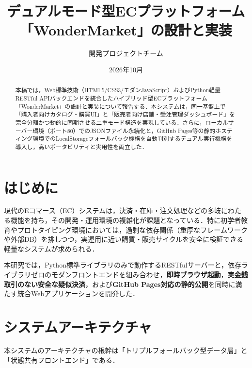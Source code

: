 \documentclass[a4paper,twocolumn,9pt]{bxjsarticle}
\title{\vspace{-1.5em}\bfseries デュアルモード型ECプラットフォーム\\「WonderMarket」の設計と実装\vspace{-0.5em}}
\author{開発プロジェクトチーム}
\date{\vspace{-0.8em}2026年10月\vspace{-1.2em}}
\begin{document}
\maketitle

\begin{abstract}
\small
本稿では，Web標準技術（HTML5/CSS3/モダンJavaScript）およびPython軽量RESTful APIバックエンドを統合したハイブリッド型ECプラットフォーム「WonderMarket」の設計と実装について報告する．本システムは，同一基盤上で「購入者向けカタログ・購買UI」と「販売者向け店舗・受注管理ダッシュボード」を完全分離かつ動的に同期させる二重モード構造を実現している．さらに，ローカルサーバー環境（ポート80）でのJSONファイル永続化と，GitHub Pages等の静的ホスティング環境でのLocalStorageフォールバック機構を自動判別するデュアル実行機構を導入し，高いポータビリティと実用性を両立した．
\end{abstract}

\section{はじめに}
現代のEコマース（EC）システムは，決済・在庫・注文処理などの多岐にわたる機能を持ち，その開発・運用環境の複雑化が課題となっている．特に初学者教育やプロトタイピング環境においては，過剰な依存関係（重厚なフレームワークや外部DB）を排しつつ，実運用に近い購買・販売サイクルを安全に検証できる軽量なシステムが求められる．

本研究では，Python標準ライブラリのみで動作するRESTfulサーバーと，依存ライブラリゼロのモダンフロントエンドを組み合わせ，\textbf{即時ブラウザ起動}，\textbf{実金銭取引のない安全な疑似決済}，および\textbf{GitHub Pages対応の静的公開}を同時に満たす統合Webアプリケーションを開発した．

\section{システムアーキテクチャ}
本システムのアーキテクチャの根幹は「トリプルフォールバック型データ層」と「状態共有フロントエンド」である．
\end{document}
